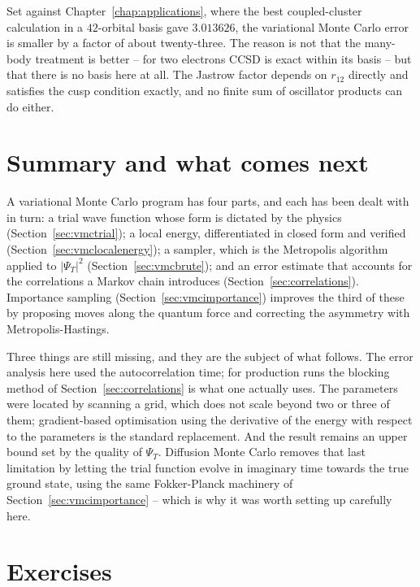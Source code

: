 Set against Chapter~\ref{chap:applications}, where the best coupled-cluster
calculation in a $42$-orbital basis gave $3.013626$, the variational Monte
Carlo error is smaller by a factor of about twenty-three.  The reason is not
that the many-body treatment is better -- for two electrons CCSD is exact
within its basis -- but that there is no basis here at all.  The Jastrow
factor depends on $r_{12}$ directly and satisfies the cusp condition exactly,
and no finite sum of oscillator products can do either.

\section{Summary and what comes next}
\label{sec:vmcsummary}

A variational Monte Carlo program has four parts, and each has been dealt with
in turn: a trial wave function whose form is dictated by the physics
(Section~\ref{sec:vmctrial}); a local energy, differentiated in closed form
and verified (Section~\ref{sec:vmclocalenergy}); a sampler, which is the
Metropolis algorithm applied to $|\Psi_T|^2$
(Section~\ref{sec:vmcbrute}); and an error estimate that accounts for the
correlations a Markov chain introduces
(Section~\ref{sec:correlations}).  Importance sampling
(Section~\ref{sec:vmcimportance}) improves the third of these by proposing
moves along the quantum force and correcting the asymmetry with
Metropolis-Hastings.

Three things are still missing, and they are the subject of what follows.  The
error analysis here used the autocorrelation time; for production runs the
blocking method of Section~\ref{sec:correlations} is what one actually uses.
The parameters were located by scanning a grid, which does not scale beyond
two or three of them; gradient-based optimisation using the derivative of the
energy with respect to the parameters is the standard replacement.  And the
result remains an upper bound set by the quality of $\Psi_T$.  Diffusion Monte
Carlo removes that last limitation by letting the trial function evolve in
imaginary time towards the true ground state, using the same Fokker-Planck
machinery of Section~\ref{sec:vmcimportance} -- which is why it was worth
setting up carefully here.

\section{Exercises}

